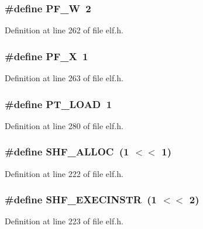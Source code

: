 \subsubsection[{PF\_\-W}]{\setlength{\rightskip}{0pt plus 5cm}\#define PF\_\-W~2}\label{elf_8h_20892094358e21f49ab6e5f8c4e29ae6}




Definition at line 262 of file elf.h.
\subsubsection[{PF\_\-X}]{\setlength{\rightskip}{0pt plus 5cm}\#define PF\_\-X~1}\label{elf_8h_1780bfb8eae34d26e52459699877c640}




Definition at line 263 of file elf.h.
\subsubsection[{PT\_\-LOAD}]{\setlength{\rightskip}{0pt plus 5cm}\#define PT\_\-LOAD~1}\label{elf_8h_84d7768fd6c6ece599d297090900cf92}




Definition at line 280 of file elf.h.
\subsubsection[{SHF\_\-ALLOC}]{\setlength{\rightskip}{0pt plus 5cm}\#define SHF\_\-ALLOC~(1 $<$$<$ 1)}\label{elf_8h_38476fe4ed88ac83ba86a4e103199a86}




Definition at line 222 of file elf.h.
\subsubsection[{SHF\_\-EXECINSTR}]{\setlength{\rightskip}{0pt plus 5cm}\#define SHF\_\-EXECINSTR~(1 $<$$<$ 2)}\label{elf_8h_b3780594e35fbbc6e5028bcb921d0a76}




Definition at line 223 of file elf.h.
